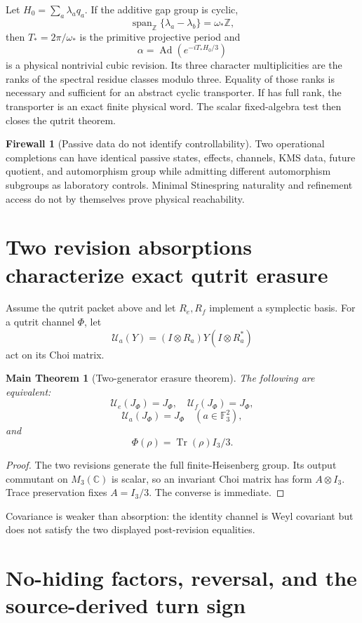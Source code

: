 \documentclass[11pt,oneside,openany]{book}
\numberwithin{equation}{chapter}
\newtheorem{maintheorem}[theorem]{Main Theorem}
\theoremstyle{definition}
\newtheorem{firewall}[theorem]{Firewall}
\theoremstyle{remark}
\newcommand{\C}{\mathbb C}
\newcommand{\Z}{\mathbb Z}
\newcommand{\Tr}{\operatorname{Tr}}
\newcommand{\Ad}{\operatorname{Ad}}
\newcommand{\Span}{\operatorname{span}}
\newcommand{\Fthree}{\mathbb F_3}
\begin{document}
Let \(H_0=\sum_a\lambda_aq_a\).  If the additive gap group is cyclic,
\[
 \Span_\Z\{\lambda_a-\lambda_b\}=\omega_*\Z,
\]
then \(T_*=2\pi/\omega_*\) is the primitive projective period and
\[
 \alpha=\Ad(e^{-iT_*H_0/3})
\]
is a physical nontrivial cubic revision.  Its three character multiplicities
are the ranks of the spectral residue classes modulo three.  Equality of those
ranks is necessary and sufficient for an abstract cyclic transporter.  If
 has full rank, the transporter is an exact finite
physical word.  The scalar fixed-algebra test then closes the qutrit theorem.

\begin{firewall}[Passive data do not identify controllability]
Two operational completions can have identical passive states, effects,
channels, KMS data, future quotient, and automorphism group while admitting
different automorphism subgroups as laboratory controls.  Minimal Stinespring
naturality and refinement access do not by themselves prove physical
reachability.
\end{firewall}

\section{Two revision absorptions characterize exact qutrit erasure}
Assume the qutrit packet above and let \(R_e,R_f\) implement a symplectic basis.
For a qutrit channel \(\Phi\), let
\[
 \mathscr U_a(Y)=(I\otimes R_a)Y(I\otimes R_a^*)
\]
act on its Choi matrix.

\begin{maintheorem}[Two-generator erasure theorem]
\label{thm:v6-erasure}
The following are equivalent:
\[
 \mathscr U_e(J_\Phi)=J_\Phi,
 \quad \mathscr U_f(J_\Phi)=J_\Phi,
\]
\[
 \mathscr U_a(J_\Phi)=J_\Phi\quad(a\in\Fthree^2),
\]
and
\[
 \boxed{\Phi(\rho)=\Tr(\rho)I_3/3.}
\]
\end{maintheorem}

\begin{proof}
The two revisions generate the full finite-Heisenberg group.  Its output
commutant on \(M_3(\C)\) is scalar, so an invariant Choi matrix has form
\(A\otimes I_3\).  Trace preservation fixes \(A=I_3/3\).  The converse is
immediate.
\end{proof}

Covariance is weaker than absorption: the identity channel is Weyl covariant
but does not satisfy the two displayed post-revision equalities.

\section{No-hiding factors, reversal, and the source-derived turn sign}
\end{document}
